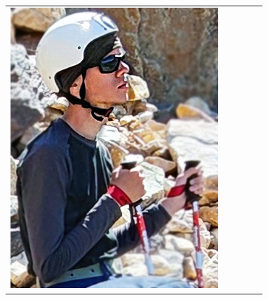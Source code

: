 \documentclass[
11pt, %
]{beamer}
\newcommand\rozhasize{0.17\textwidth}
\begin{document}
\begin{frame}
\begin{tabular}{ccccc}
	\hline
	\begin{minipage}{\rozhasize}
	\includegraphics[width=\textwidth]{../pics/portraits/dima_d}
	\end{minipage} &
	\begin{minipage}{\rozhasize}

\end{minipage}
\end{tabular}
\end{frame}
\end{document}

